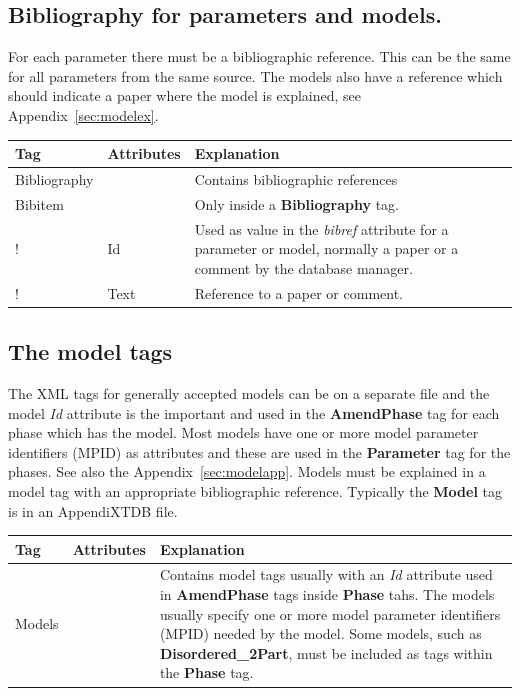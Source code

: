\documentclass{article}
\begin{document}
\subsection{Bibliography for parameters and models.}\label{sec:biblio}

For each parameter there must be a bibliographic reference.  This can
be the same for all parameters from the same source.  The models also
have a reference which should indicate a paper where the model is
explained, see Appendix~\ref{sec:modelex}.

\bigskip
\begin{tabular}{|p{} p{} p{}|}\hline
  Tag & Attributes &  Explanation\\\hline

  Bibliography & & Contains bibliographic references\\\hline

  Bibitem & & Only inside a {\bf Bibliography} tag.\\
!      & Id &   Used as value in the {\em bibref} attribute for a parameter
            or model, normally a paper or a comment by the database manager.\\
!      & Text & Reference to a paper or comment.\\\hline

\end{tabular}

\subsection{The model tags}\label{sec:models}

The XML tags for generally accepted models can be on a separate file
and the model {\em Id} attribute is the important and used in the {\bf
  AmendPhase} tag for each phase which has the model.  Most models
have one or more model parameter identifiers (MPID) as attributes and
these are used in the {\bf Parameter} tag for the phases.  See also
the Appendix~\ref{sec:modelapp}.  Models must be explained in a model
tag with an appropriate bibliographic reference.  Typically the {\bf
  Model} tag is in an AppendiXTDB file.

\bigskip
\begin{tabular}{|p{} p{} p{}|}\hline
  Tag & Attributes & Explanation\\\hline

  Models & & Contains model tags usually with an {\em Id} attribute
  used in {\bf AmendPhase} tags inside {\bf Phase} tahs.  The models
  usually specify one or more model parameter identifiers (MPID)
  needed by the model.  Some models, such as {\bf Disordered\_2Part},
  must be included as tags within the {\bf Phase} tag.\\\hline
\end{tabular}
\end{document}
